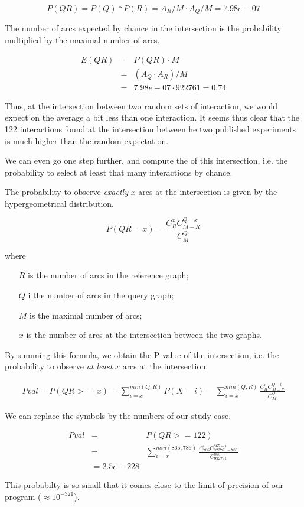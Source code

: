 \begin{enumerate}
\[P(QR) = P(Q)*P(R) = A_R/M \cdot A_Q/M = 7.98e-07\]

The number of arcs expected by chance in the intersection is the
probability multiplied by the maximal number of arcs.

\begin{eqnarray*}
E(QR) & = & P(QR) \cdot M  \\
 & = & (A_Q \cdot A_R)/M \\
 & = &  7.98e-07 \cdot 922761 = 0.74
\end{eqnarray*}

Thus, at the intersection between two random sets of interaction, we
would expect on the average a bit less than one interaction. It seems
thus clear that the 122 interactions found at the intersection between
he two published experiments is much higher than the random
expectation.

We can even go one step further, and compute the 
of this intersection, i.e. the probability to select at least that
many interactions by chance. 

The probability to observe \textit{exactly} $x$ arcs at the
intersection is given by the hypergeometrical distribution.

\begin{equation}
\label{eq:hypergeometric_density}
P(QR=x)=\frac{C^{x}_{R}C^{Q-x}_{M-R}}{C^Q_{M}}
\end{equation}

where 
\begin{itemize}
\item[$R$] is the number of arcs in the reference graph;
\item[$Q$] i the number of arcs in the query graph;
\item[$M$] is the maximal number of arcs;
\item[$x$] is the number of arcs at the intersection between the two
  graphs.
\end{itemize}

By summing this formula, we obtain the P-value of the intersection,
i.e. the probability to observe \textit{at least} $x$ arcs at the
intersection.

\begin{eqnarray*}
\label{eq:hypergeometric_density_cdf}
Pval = P(QR>=x)=\sum_{i=x}^{min(Q,R)}P(X=i)=\sum_{i=x}^{min(Q,R)} \frac{C^i_{R}C^{Q-i}_{M-R}}{C^Q_{M}}
\end{eqnarray*}

We can replace the symbols by the numbers of our study case.

\begin{eqnarray*}
\label{eq:hypergeometric_density_cdf}
Pval & = & P(QR>=122) \\
 & = & \sum_{i=x}^{min(865,786)} \frac{C^i_{786}C^{865-i}_{922761-786}}{C^{865}_{922761}}  \\
 & =  2.5e-228
\end{eqnarray*}

This probabilty is so small that it comes close to the limit of
precision of our program ($\approx 10^{-321}$).

\end{enumerate}


